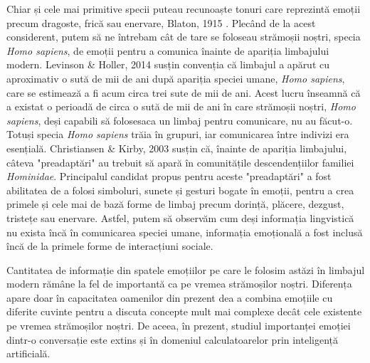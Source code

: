 \documentclass[a4paper,12pt]{book}
\begin{document}
				Chiar și cele mai primitive specii puteau recunoaște tonuri care reprezintă emoții precum dragoste, frică sau enervare, Blaton, 1915 \cite{blanton}. Plecând de la acest considerent, putem să ne întrebam cât de tare se foloseau strămoșii noștri, specia \textit{Homo sapiens}, de emoții pentru a comunica înainte de apariția limbajului modern.  Levinson \& Holler, 2014 \cite{leviholler} susțin convenția că limbajul a apărut cu aproximativ o sută de mii de ani după apariția speciei umane, \textit{Homo sapiens}, care se estimează a fi acum circa trei sute de mii de ani. Acest lucru înseamnă că a existat o perioadă de circa o sută de mii de ani în care strămoșii noștri, \textit{Homo sapiens}, deși capabili să folosesaca un limbaj pentru comunicare, nu au făcut-o. Totuși specia \textit{Homo sapiens} trăia în grupuri, iar comunicarea între indivizi era esențială. Christiansen \& Kirby, 2003 \cite{chriskirbi} susțin că, înainte de apariția limbajului, câteva "preadaptări" au trebuit să apară în comunitățile descendențiilor familiei \textit{Hominidae}. Principalul candidat propus pentru aceste "preadaptări" a fost abilitatea de a folosi simboluri, sunete și gesturi bogate în emoții, pentru a crea primele și cele mai de bază forme de limbaj precum dorință, plăcere, dezgust, tristețe sau enervare. Astfel, putem să observăm cum deși informația lingvistică nu exista încă în comunicarea speciei umane, informația emoțională a fost inclusă încă de la primele forme de interacțiuni sociale.  \par					
				
				Cantitatea de informație din spatele emoțiilor pe care le folosim astăzi în limbajul modern rămâne la fel de importantă ca pe vremea strămoșilor noștri. Diferența apare doar în capacitatea oamenilor din prezent dea a combina emoțiile cu diferite cuvinte pentru a discuta concepte mult mai complexe decât cele existente pe vremea strămoșilor noștri. De aceea, în prezent, studiul importanței emoției dintr-o conversație este extins și în domeniul calculatoarelor prin inteligență artificială. \par 	
				
\end{document}
